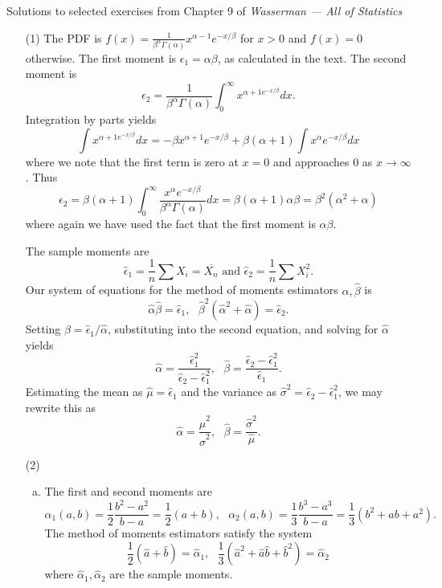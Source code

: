 \documentclass[10pt]{article}
\begin{document}
\noindent \large{Solutions to selected exercises from Chapter 9 of
\emph{Wasserman --- All of Statistics}}

\begin{enumerate}
\item[(1)]
The PDF is $f(x)=\frac{1}{\beta^\alpha \Gamma(\alpha)}x^{\alpha-1}e^{-x/\beta}$
for $x>0$ and $f(x)=0$ otherwise.
The first moment is $\epsilon_1=\alpha\beta$, as calculated in the text.
The second moment is
\[
\epsilon_2 = \frac{1}{\beta^\alpha \Gamma(\alpha)}
\int_0^\infty x^{\alpha+1e^{-x/\beta}}dx.
\]
Integration by parts yields
\[
\int x^{\alpha+1e^{-x/\beta}}dx = -\beta x^{\alpha+1}e^{-x/\beta} +
\beta(\alpha+1)\int x^{\alpha}e^{-x/\beta}dx
\]
where we note that the first term is zero at $x=0$ and approaches 0 as
$x\to \infty$.
Thus
\[
\epsilon_2 =
\beta(\alpha+1)\int_0^\infty \frac{x^\alpha e^{-x/\beta}}{\beta^\alpha\Gamma(\alpha)}dx
= \beta(\alpha+1)\alpha\beta=\beta^2(\alpha^2+\alpha)
\]
where again we have used the fact that the first moment is $\alpha\beta$.

The sample moments are
\[
\hat \epsilon_1 = \frac{1}{n} \sum X_i = \overline{X_n} \text{ and }
\hat \epsilon_2 = \frac{1}{n} \sum X_i^2.
\]
Our system of equations for the method of moments estimators
$\hat \alpha, \hat \beta$ is
\[
\hat \alpha \hat \beta = \hat \epsilon_1, \ \ \
\hat \beta^2 (\hat \alpha^2 + \hat \alpha) = \hat \epsilon_2.
\]
Setting $\hat \beta=\hat \epsilon_1 / \hat \alpha$, substituting into the
second equation, and solving for $\hat \alpha$ yields
\[
\hat \alpha = \frac{\hat \epsilon_1^2}{\hat \epsilon_2 - \hat \epsilon_1^2}, \ \ \
\hat \beta = \frac{\hat \epsilon_2 - \hat \epsilon_1^2}{\hat \epsilon_1}.
\]
Estimating the mean as $\hat \mu = \hat \epsilon_1$ and the variance as
$\hat \sigma^2 = \hat \epsilon_2 - \hat \epsilon_1^2$, we may rewrite this as
\[
\hat \alpha = \frac{\hat \mu^2}{\hat \sigma^2}, \ \ \
\hat \beta = \frac{\hat \sigma^2}{\hat \mu}.
\]

\item[(2)]
\begin{enumerate}[(a)]
\item The first and second moments are
\[
\alpha_1(a, b) = \frac{1}{2}\frac{b^2-a^2}{b-a} =
\frac{1}{2}(a+b), \ \ \
\alpha_2(a, b) = \frac{1}{3}\frac{b^3-a^3}{b-a} =
\frac{1}{3}(b^2+ab+a^2).
\]
The method of moments estimators satisfy the system
\[
\frac{1}{2}(\hat a + \hat b) = \hat \alpha_1, \ \ \
\frac{1}{3}(\hat a^2 + \hat a \hat b + \hat b^2) = \hat \alpha_2
\]
where $\hat \alpha_1, \hat \alpha_2$ are the sample moments.


\end{enumerate}
\end{enumerate}
\end{document}

